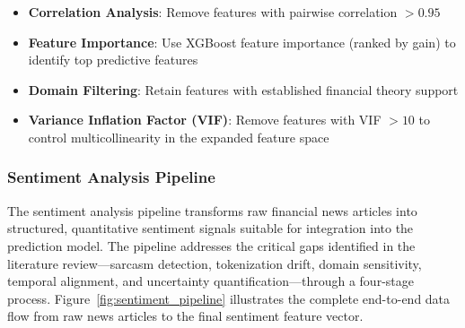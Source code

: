 \begin{itemize}
    \item \textbf{Correlation Analysis}: Remove features with pairwise correlation $> 0.95$
    \item \textbf{Feature Importance}: Use XGBoost feature importance (ranked by gain) to identify top predictive features
    \item \textbf{Domain Filtering}: Retain features with established financial theory support
    \item \textbf{Variance Inflation Factor (VIF)}: Remove features with VIF $> 10$ to control multicollinearity in the expanded feature space
\end{itemize}

\subsubsection{Sentiment Analysis Pipeline}
\label{sec:sentiment_pipeline}

The sentiment analysis pipeline transforms raw financial news articles into structured, quantitative sentiment signals suitable for integration into the prediction model. The pipeline addresses the critical gaps identified in the literature review---sarcasm detection, tokenization drift, domain sensitivity, temporal alignment, and uncertainty quantification---through a four-stage process. Figure~\ref{fig:sentiment_pipeline} illustrates the complete end-to-end data flow from raw news articles to the final sentiment feature vector.

